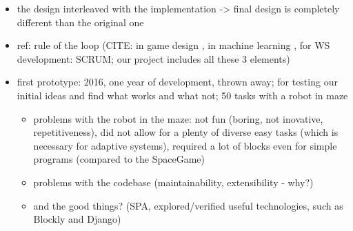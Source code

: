 \begin{itemize}
\item the design interleaved with the implementation -> final design is completely different than the original one
\item ref: rule of the loop
  (CITE: in game design \cite{book-of-lenses},
  in machine learning \cite[][Rule \#16]{google-ml-rules},
  for WS development: SCRUM; our project includes all these 3 elements)
\item first prototype: 2016, one year of development, thrown away; for testing our initial ideas and find what works and what not; 50 tasks with a robot in maze
  \begin{itemize}
  \item problems with the robot in the maze: not fun (boring, not inovative, repetitiveness), did not allow for a plenty of diverse easy tasks (which is necessary for adaptive systems), required a lot of blocks even for simple programs (compared to the SpaceGame)
  \item problems with the codebase (maintainability, extensibility - why?)
  \item and the good things? (SPA, explored/verified useful technologies, such as Blockly and Django)
  \end{itemize}
\end{itemize}

